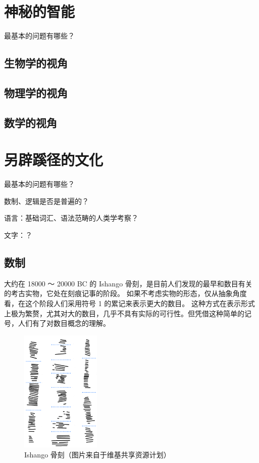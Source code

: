 \documentclass[a4paper,10.5pt]{book}
\begin{document}



\chapter{神秘的智能}

最基本的问题有哪些？

\section{生物学的视角}

\section{物理学的视角}

\section{数学的视角}




\chapter{另辟蹊径的文化}

最基本的问题有哪些？

数制、逻辑是否是普遍的？

语言：基础词汇、语法范畴的人类学考察？

文字：？

\section{数制}

大约在 18000 ～ 20000 BC 的 Ishango 骨刻，是目前人们发现的最早和数目有关的考古实物，它处在刻痕记事的阶段。
如果不考虑实物的形态，仅从抽象角度看，在这个阶段人们采用符号 1 的累记来表示更大的数目。
这种方式在表示形式上极为繁赘，尤其对大的数目，几乎不具有实际的可行性。但凭借这种简单的记号，人们有了对数目概念的理解。

\begin{figure}[ht]
\centering
\includegraphics[width=1.5in]{images/IshangoAllColumns.png}
\caption{Ishango 骨刻（图片来自于维基共享资源计划）}
\end{figure}
\end{document}
